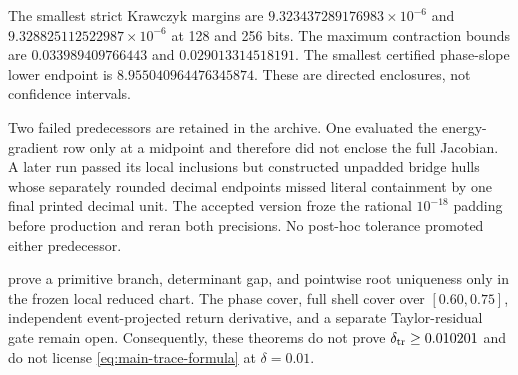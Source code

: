 The smallest strict Krawczyk margins are
\(9.323437289176983\times10^{-6}\) and
\(9.328825112522987\times10^{-6}\) at 128 and 256 bits.  The maximum
contraction bounds are \(0.033989409766443\) and
\(0.029013314518191\).  The smallest certified phase-slope lower endpoint is
\(8.955040964476345874\).  These are directed enclosures, not confidence
intervals.

Two failed predecessors are retained in the archive.  One evaluated the
energy-gradient row only at a midpoint and therefore did not enclose the
full Jacobian.  A later run passed its local inclusions but constructed
unpadded bridge hulls whose separately rounded decimal endpoints missed
literal containment by one final printed decimal unit.  The accepted version
froze the rational \(10^{-18}\) padding before production and reran both
precisions.  No post-hoc tolerance promoted either predecessor.

\begin{remark}
\label{rem:nonpromotion}
 prove a
primitive branch, determinant gap, and pointwise root uniqueness only in the
frozen local reduced chart.  The phase cover, full shell cover over
\([0.60,0.75]\), independent
event-projected return derivative, and a separate Taylor-residual gate remain
open.  Consequently, these theorems do not prove
\(\delta_{\rm tr}\ge0.010201\) and do not license
\cref{eq:main-trace-formula} at \(\delta=0.01\).
\end{remark}
